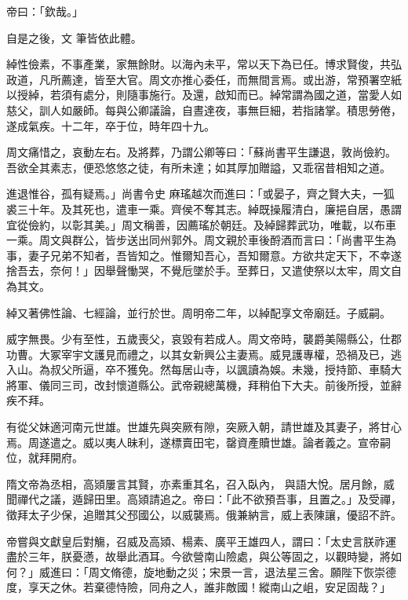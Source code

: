 \begin{pinyinscope}
 帝曰：「欽哉。」



 自是之後，文
 筆皆依此體。



 綽性儉素，不事產業，家無餘財。以海內未平，常以天下為已任。博求賢俊，共弘政道，凡所薦達，皆至大官。周文亦推心委任，而無間言焉。或出游，常預署空紙以授綽，若須有處分，則隨事施行。及還，啟知而已。綽常謂為國之道，當愛人如慈父，訓人如嚴師。每與公卿議論，自晝達夜，事無巨細，若指諸掌。積思勞倦，遂成氣疾。十二年，卒于位，時年四十九。



 周文痛惜之，哀動左右。及將葬，乃謂公卿等曰：「蘇尚書平生謙退，敦尚儉約。吾欲全其素志，便恐悠悠之徒，有所未達；如其厚加贈謚，又乖宿昔相知之道。



 進退惟谷，孤有疑焉。」尚書令史
 麻瑤越次而進曰：「或晏子，齊之賢大夫，一狐裘三十年。及其死也，遣車一乘。齊侯不奪其志。綽既操履清白，廉挹自居，愚謂宜從儉約，以彰其美。」周文稱善，因薦瑤於朝廷。及綽歸葬武功，唯載，以布車一乘。周文與群公，皆步送出同州郭外。周文親於車後酹酒而言曰：「尚書平生為事，妻子兄弟不知者，吾皆知之。惟爾知吾心，吾知爾意。方欲共定天下，不幸遂捨吾去，奈何！」因舉聲慟哭，不覺卮墜於手。至葬日，又遣使祭以太牢，周文自為其文。



 綽又著佛性論、七經論，並行於世。周明帝二年，以綽配享文帝廟廷。子威嗣。



 威字無畏。少有至性，五歲喪父，哀毀有若成人。周文帝時，襲爵美陽縣公，仕郡功曹。大冢宰宇文護見而禮之，以其女新興公主妻焉。威見護專權，恐禍及已，逃入山。為叔父所逼，卒不獲免。然每居山寺，以諷讀為娛。未幾，授持節、車騎大將軍、儀同三司，改封懷道縣公。武帝親總萬機，拜稍伯下大夫。前後所授，並辭疾不拜。



 有從父妹適河南元世雄。世雄先與突厥有隙，突厥入朝，請世雄及其妻子，將甘心焉。周遂遣之。威以夷人昧利，遂標賣田宅，罄資產贖世雄。論者義之。宣帝嗣位，就拜開府。



 隋文帝為丞相，高熲屢言其賢，亦素重其名，召入臥內，
 與語大悅。居月餘，威聞禪代之議，遁歸田里。高熲請追之。帝曰：「此不欲預吾事，且置之。」及受禪，徵拜太子少保，追贈其父邳國公，以威襲焉。俄兼納言，威上表陳讓，優詔不許。



 帝嘗與文獻皇后對觴，召威及高熲、楊素、廣平王雄四人，謂曰：「太史言朕祚運盡於三年，朕憂懣，故舉此酒耳。今欲營南山險處，與公等固之，以觀時變，將如何？」威進曰：「周文脩德，旋地動之災；宋景一言，退法星三舍。願陛下恢崇德度，享天之休。若棄德恃險，同舟之人，誰非敵國！縱南山之岨，安足固哉？」




\end{pinyinscope}
